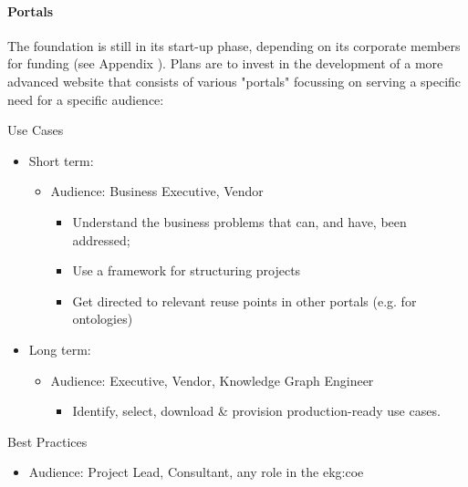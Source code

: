 \paragraph{Portals}

The foundation is still in its start-up phase, depending on its corporate members for funding
(see Appendix ).
Plans are to invest in the development of a more advanced website that consists of various "portals" focussing
on serving a specific need for a specific audience:

\begin{basedescript}{%
    \desclabelstyle{\multilinelabel}
    \desclabelwidth{2cm}
}
    \item[Use Cases]
        \begin{itemize}
            \item Short term:
            \begin{itemize}
                \item Audience: Business Executive, Vendor
                    \begin{itemize}
                        \item Understand the business problems that can, and have, been addressed;
                        \item Use a framework for structuring projects
                        \item Get directed to relevant reuse points in other portals (e.g. for ontologies)
                    \end{itemize}
            \end{itemize}
            \item Long term:
            \begin{itemize}
                \item Audience: Executive, Vendor, Knowledge Graph Engineer
                    \begin{itemize}
                        \item Identify, select, download \& provision production-ready use cases.
                    \end{itemize}
            \end{itemize}
        \end{itemize}
    \item[Best Practices]
        \begin{itemize}
            \item Audience: Project Lead, Consultant, any role in the \gls{ekg:coe}

\end{itemize}
\end{basedescript}

